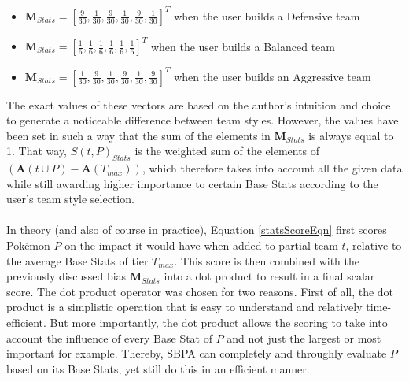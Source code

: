 \documentclass{article}
\begin{document}
\begin{itemize}
	\item $\textbf{M}_{Stats}=[\frac{9}{30},\frac{1}{30},\frac{9}{30},\frac{1}{30},\frac{9}{30},\frac{1}{30}]^T$ when the user builds a Defensive team
	\item $\textbf{M}_{Stats}=[\frac{1}{6},\frac{1}{6},\frac{1}{6},\frac{1}{6},\frac{1}{6},\frac{1}{6}]^T$ when the user builds a Balanced team
	\item $\textbf{M}_{Stats}=[\frac{1}{30},\frac{9}{30},\frac{1}{30},\frac{9}{30},\frac{1}{30},\frac{9}{30}]^T$ when the user builds an Aggressive team
\end{itemize}
The exact values of these vectors are based on the author's intuition and choice to generate a noticeable difference between team styles. However, the values have been set in such a way that the sum of the elements in $\textbf{M}_{Stats}$ is always equal to 1. That way, $S(t,P)_{Stats}$ is the weighted sum of the elements of $(\textbf{A}(t\cup P)-\textbf{A}(T_{max}))$, which therefore takes into account all the given data while still awarding higher importance to certain Base Stats according to the user's team style selection.\\\\
In theory (and also of course in practice), Equation \ref{statsScoreEqn} first scores Pok\'emon $P$ on the impact it would have when added to partial team $t$, relative to the average Base Stats of tier $T_{max}$. This score is then combined with the previously discussed bias $\textbf{M}_{Stats}$ into a dot product to result in a final scalar score. The dot product operator was chosen for two reasons. First of all, the dot product is a simplistic operation that is easy to understand and relatively time-efficient. But more importantly, the dot product allows the scoring to take into account the influence of every Base Stat of $P$ and not just the largest or most important for example. Thereby, SBPA can completely and throughly evaluate $P$ based on its Base Stats, yet still do this in an efficient manner.
\end{document}
